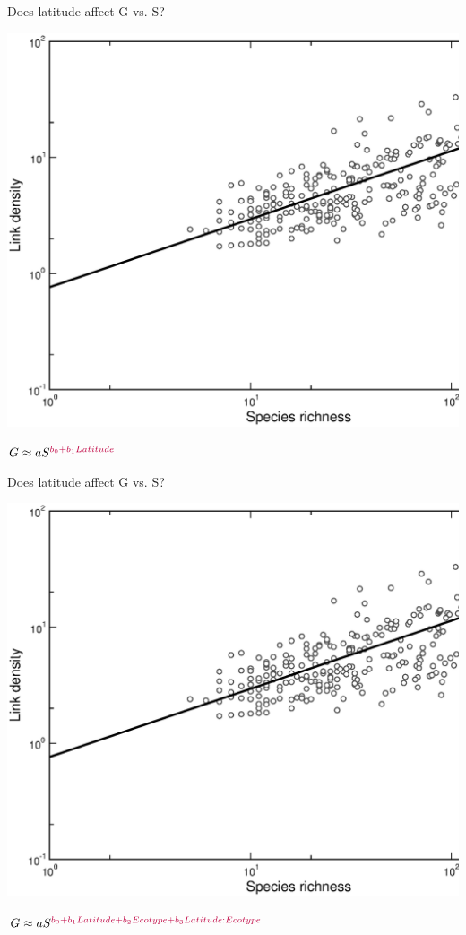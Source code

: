 \documentclass{beamer}
\begin{document}
  \begin{frame}{Does latitude affect G vs. S?}
    \begin{center}
      \includegraphics*[width=.8\textwidth]{Figures/results/LS_vs_S_fitline_observed.eps}

      \vspace{.5cm}
    \end{center}
    \hspace{1in}
      $G \approx aS^{\color{purple}b_0+b_1Latitude}$

  \end{frame}


  \begin{frame}{Does latitude affect G vs. S?}
    \begin{center}
      \includegraphics*[width=.8\textwidth]{Figures/results/LS_vs_S_fitline_observed.eps}

      \vspace{.5cm}
    \end{center}
    \hspace{1in}
      $G \approx aS^{\color{purple}b_0+b_1Latitude+b_2Ecotype+b_3Latitude:Ecotype}$

  \end{frame}
\end{document}
